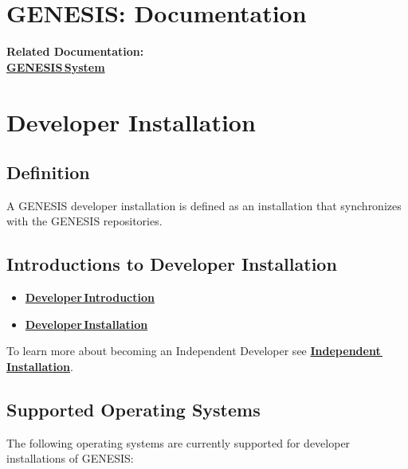 \documentclass[12pt]{article}
\begin{document}
\section*{GENESIS: Documentation}

{\bf Related Documentation:} \\
\href{../genesis-system/genesis-system.tex}{\bf GENESIS\,System}

\section*{Developer Installation}

\subsection*{Definition}

A GENESIS developer installation is defined as an installation that synchronizes with the GENESIS repositories.

\subsection*{Introductions to Developer Installation}

\begin{itemize}
   \item[]\href{../developer-intro/developer-intro.tex}{\bf Developer\,Introduction}
   \item[]\href{../installation-developer/installation-developer.tex}{\bf Developer\,Installation}
\end{itemize}
To learn more about becoming an Independent Developer see \href{../installation-independent/installation-independent.tex}{\bf Independent\,Installation}.

\subsection*{Supported Operating Systems}

The following operating systems are currently supported for developer installations of GENESIS:
\end{document}
